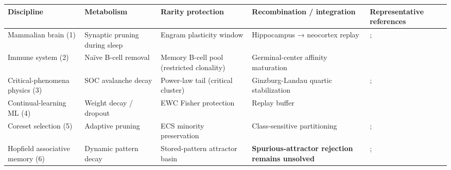 {\def\LTcaptype{none} %
\begin{longtable}[]{@{}
  >{\raggedright\arraybackslash}p{}
  >{\raggedright\arraybackslash}p{}
  >{\raggedright\arraybackslash}p{}
  >{\raggedright\arraybackslash}p{}
  >{\raggedright\arraybackslash}p{}@{}}
\toprule\noalign{}
\begin{minipage}[b]{\linewidth}\raggedright
Discipline
\end{minipage} & \begin{minipage}[b]{\linewidth}\raggedright
Metabolism
\end{minipage} & \begin{minipage}[b]{\linewidth}\raggedright
Rarity protection
\end{minipage} & \begin{minipage}[b]{\linewidth}\raggedright
Recombination / integration
\end{minipage} & \begin{minipage}[b]{\linewidth}\raggedright
Representative references
\end{minipage} \\
\midrule\noalign{}
\endhead
\bottomrule\noalign{}
\endlastfoot
Mammalian brain (1) & Synaptic pruning during sleep & Engram plasticity window & Hippocampus → neocortex replay & \citet{mcclelland1995cls}; \citet{tartaglia2025twofactor} \\
Immune system (2) & Naïve B-cell removal & Memory B-cell pool (restricted clonality) & Germinal-center affinity maturation & \citet{mesin2020gc} \\
Critical-phenomena physics (3) & SOC avalanche decay & Power-law tail (critical cluster) & Ginzburg-Landau quartic stabilization & \citet{bak1987soc}; \citet{ginzburg1950superconductivity} \\
Continual-learning ML (4) & Weight decay / dropout & EWC Fisher protection & Replay buffer & \citet{kirkpatrick2017ewc} \\
Coreset selection (5) & Adaptive pruning & ECS minority preservation & Class-sensitive partitioning & \citet{sener2018coreset}; \citet{wang2024ecs} \\
Hopfield associative memory (6) & Dynamic pattern decay & Stored-pattern attractor basin & \textbf{Spurious-attractor rejection remains unsolved} & \citet{hopfield1982neural}; \citet{ramsauer2021hopfield} \\

\end{longtable}}
